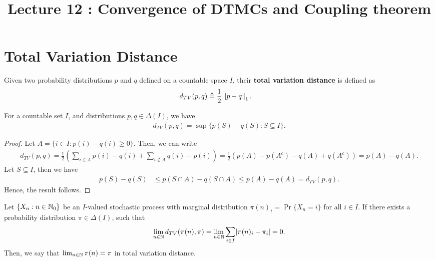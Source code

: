 \documentclass[a4paper,10pt,english]{article}
\title{Lecture 12 : Convergence of DTMCs and Coupling theorem}
\author{}
\begin{document}
\maketitle

\section{Total Variation Distance}
\begin{defn} Given two probability distributions $p$ and $q$ defined on a countable space $I$, their \textbf{total variation distance} is defined as
\begin{align*}
d_{TV}(p,q) &\triangleq \dfrac{1}{2}\left\lVert p-q\right\rVert_1.
\end{align*}
\end{defn}
\begin{lem} For a countable set $I$, and distributions $p, q \in \Delta(I)$, we have 
\begin{align*}
d_{TV}(p,q) = \sup\{ p(S) - q(S) : S \subseteq I \}.
\end{align*}
\end{lem}
\begin{proof} 
Let $A = \{ i \in I: p(i) - q(i) \geq 0\}$. Then, we can write
\begin{align*}
d_{TV}(p,q) = \frac{1}{2}\left(\sum_{i \in A}p(i) - q(i) + \sum_{i \notin A} q(i) - p(i) \right)= \frac{1}{2}\left(p(A) - p(A^c) - q(A) + q(A^c) \right) = p(A)-q(A).
\end{align*}
Let $S \subseteq I$, then we have
\begin{align*}
p(S)-q(S) &\leq p(S\cap A) - q(S \cap A) \leq p(A) - q(A) = d_{TV}(p,q).
\end{align*}
Hence, the result follows.
\end{proof}
\begin{defn} Let $\{X_n : n \in \mathbb{N}_0\}$ be an $I$-valued stochastic process with marginal distribution $\pi(n)_i = \Pr\{X_n = i\}$ for all $i \in I$. 
If  there exists a probability distribution $\pi \in \Delta(I)$, such that 
\begin{align*}
\lim_{n \in \mathbb{N}} d_{TV}(\pi(n), \pi) = \lim_{n \in \mathbb{N}} \sum_{i \in I} \lvert\pi(n)_i - \pi_i\rvert = 0.
\end{align*}
Then, we say that $\lim_{n \in \mathbb{N}}\pi(n) = \pi$ in total variation distance.
\end{defn}
\end{document}

